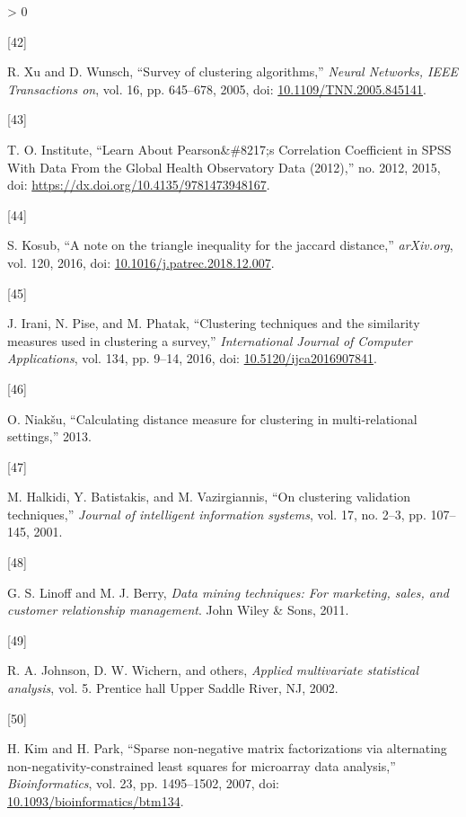 \documentclass[
]{article}
\newlength{\cslhangindent}
\newlength{\csllabelwidth}
\newenvironment{CSLReferences}[3] %
 {%
  \setlength{\parindent}{0pt}
  \ifodd #1 \everypar{\setlength{\hangindent}{\cslhangindent}}\ignorespaces\fi
  \ifnum #2 > 0
  \setlength{\parskip}{#2\baselineskip}
  \fi
 }%
 {}
\newcommand{\CSLLeftMargin}[1]{\parbox[t]{\csllabelwidth}{#1}}
\newcommand{\CSLRightInline}[1]{\parbox[t]{\linewidth - \csllabelwidth}{#1}}
\begin{document}
\begin{CSLReferences}{0}{0}
\leavevmode\hypertarget{ref-Rruidonald2005}{}%
\CSLLeftMargin{{[}42{]} }
\CSLRightInline{R. Xu and D. Wunsch, {``Survey of clustering
algorithms,''} \emph{Neural Networks, IEEE Transactions on}, vol. 16,
pp. 645--678, 2005, doi:
\href{https://doi.org/10.1109/TNN.2005.845141}{10.1109/TNN.2005.845141}.}

\leavevmode\hypertarget{ref-Rinstitute2015}{}%
\CSLLeftMargin{{[}43{]} }
\CSLRightInline{T. O. Institute, {``{Learn About Pearson{\&}{\#}8217;s
Correlation Coefficient in SPSS With Data From the Global Health
Observatory Data (2012)},''} no. 2012, 2015, doi:
\url{https://dx.doi.org/10.4135/9781473948167}.}

\leavevmode\hypertarget{ref-Rsven2016}{}%
\CSLLeftMargin{{[}44{]} }
\CSLRightInline{S. Kosub, {``A note on the triangle inequality for the
jaccard distance,''} \emph{arXiv.org}, vol. 120, 2016, doi:
\href{https://doi.org/10.1016/j.patrec.2018.12.007}{10.1016/j.patrec.2018.12.007}.}

\leavevmode\hypertarget{ref-Rjasminenittinmadhura2016}{}%
\CSLLeftMargin{{[}45{]} }
\CSLRightInline{J. Irani, N. Pise, and M. Phatak, {``Clustering
techniques and the similarity measures used in clustering{} a survey,''}
\emph{International Journal of Computer Applications}, vol. 134, pp.
9--14, 2016, doi:
\href{https://doi.org/10.5120/ijca2016907841}{10.5120/ijca2016907841}.}

\leavevmode\hypertarget{ref-Rolegas2013}{}%
\CSLLeftMargin{{[}46{]} }
\CSLRightInline{O. Niakšu, {``Calculating distance measure for
clustering in multi-relational settings,''} 2013.}

\leavevmode\hypertarget{ref-Rmariayannismichalis2001}{}%
\CSLLeftMargin{{[}47{]} }
\CSLRightInline{M. Halkidi, Y. Batistakis, and M. Vazirgiannis, {``On
clustering validation techniques,''} \emph{Journal of intelligent
information systems}, vol. 17, no. 2--3, pp. 107--145, 2001.}

\leavevmode\hypertarget{ref-Rgordonsja2011}{}%
\CSLLeftMargin{{[}48{]} }
\CSLRightInline{G. S. Linoff and M. J. Berry, \emph{Data mining
techniques: For marketing, sales, and customer relationship management}.
John Wiley \& Sons, 2011.}

\leavevmode\hypertarget{ref-Rarnoldeanwothers2002}{}%
\CSLLeftMargin{{[}49{]} }
\CSLRightInline{R. A. Johnson, D. W. Wichern, and others, \emph{Applied
multivariate statistical analysis}, vol. 5. Prentice hall Upper Saddle
River, NJ, 2002.}

\leavevmode\hypertarget{ref-Rhyunsoohaesun2007}{}%
\CSLLeftMargin{{[}50{]} }
\CSLRightInline{H. Kim and H. Park, {``{Sparse non-negative matrix
factorizations via alternating non-negativity-constrained least squares
for microarray data analysis},''} \emph{Bioinformatics}, vol. 23, pp.
1495--1502, 2007, doi:
\href{https://doi.org/10.1093/bioinformatics/btm134}{10.1093/bioinformatics/btm134}.}


\end{CSLReferences}
\end{document}
